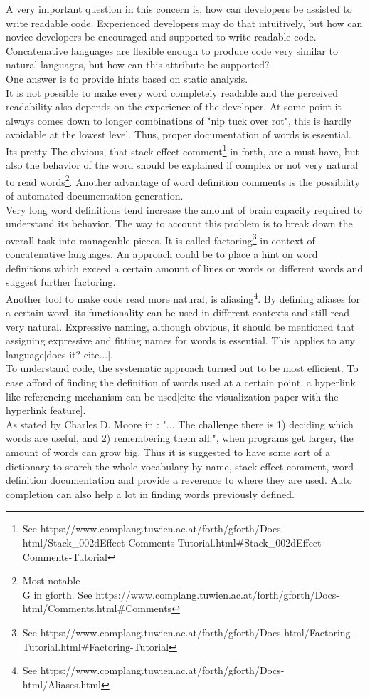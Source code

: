 A very important question in this concern is, how can developers be assisted to write readable code. Experienced developers may do that intuitively, but how can novice developers be encouraged and supported to write readable code. Concatenative languages are flexible enough to produce code very similar to natural languages, but how can this attribute be supported?\\
One answer is to provide hints based on static analysis.\\
It is not possible to make every word completely readable and the perceived readability also depends on the experience of the developer. At some point  it always comes down to longer combinations of "nip tuck over rot", this is hardly avoidable at the lowest level. Thus, proper documentation of words is essential. Its pretty The obvious, that stack effect comment\footnote{See https://www.complang.tuwien.ac.at/forth/gforth/Docs-html/Stack\_002dEffect-Comments-Tutorial.html\#Stack\_002dEffect-Comments-Tutorial} in forth, are a must have, but also the behavior of the word should be explained if complex or not very natural to read words\footnote{Most notable \\G in gforth. See https://www.complang.tuwien.ac.at/forth/gforth/Docs-html/Comments.html\#Comments}. Another advantage of word definition comments is the possibility of automated documentation generation.\\
Very long word definitions tend increase the amount of brain capacity required to understand its behavior. The way to account this problem is to break down the overall task into manageable pieces. It is called factoring\footnote{See https://www.complang.tuwien.ac.at/forth/gforth/Docs-html/Factoring-Tutorial.html\#Factoring-Tutorial} in context of concatenative languages. An approach could be to place a hint on word definitions which exceed a certain amount of lines or words or different words and suggest further factoring.\\
Another tool to make code read more natural, is aliasing\footnote{See https://www.complang.tuwien.ac.at/forth/gforth/Docs-html/Aliases.html}. By defining aliases for a certain word, its functionality can be used in different contexts and still read very natural.
Expressive naming, although obvious, it should be mentioned that assigning expressive and fitting names for words is essential. This applies to any language[does it? cite...].\\
To understand code, the systematic approach turned out to be most efficient\cite{Robillard:2004:EDI:1042203.1042417}. To ease afford of finding the definition of words used at a certain point, a hyperlink like referencing mechanism can be used[cite the visualization paper with the hyperlink feature].\\
As stated by \gls{Charles D. Moore} in \cite{Biancuzzi:2009:MPC:1592983}: "... The challenge there is 1) deciding
which words are useful, and 2) remembering them all.", when programs get larger, the amount of words can grow big. Thus it is suggested to have some sort of a dictionary to search the whole vocabulary by name, stack effect comment, word definition documentation and provide a reverence to where they are used. Auto completion can also help a lot in finding words previously defined.

